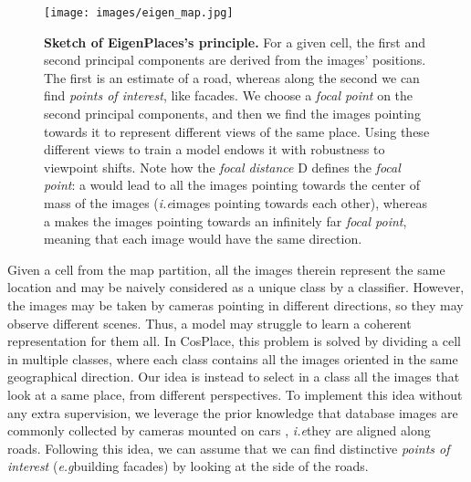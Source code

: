 \documentclass[10pt,twocolumn,letterpaper]{article}
\def\eg{\emph{e.g}\onedot}
\def\ie{\emph{i.e}\onedot}
\begin{document}
\begin{figure}
    \begin{center}
    \texttt{[image: images/eigen\_map.jpg]}
    \end{center}
    \caption{\textbf{Sketch of EigenPlaces's principle.}
    For a given cell, the first and second principal components are derived from the images' positions.
    The first is an estimate of a road, whereas along the second we can find \textit{points of interest}, like facades.
    We choose a \textit{focal point} on the second principal components, and then we find the images pointing towards it to represent different views of the same place. Using these different views to train a model endows it with robustness to viewpoint shifts.
    Note how the \textit{focal distance} D defines the \textit{focal point}: a  would lead to all the images pointing towards the center of mass of the images (\ie images pointing towards each other), whereas a  makes the images pointing towards an infinitely far \textit{focal point}, meaning that each image would have the same direction.
    }
    \label{fig:eigen_map}
\end{figure}
 Given a cell from the map partition, all the images therein represent the same location and may be naively considered as a unique class by a classifier. However, the images may be taken by cameras pointing in different directions, so they may observe different scenes.
Thus, a model may struggle to learn a coherent representation for them all.
In CosPlace, this problem is solved by dividing a cell in multiple classes, where each class contains all the images oriented in the same geographical direction. 
Our idea is instead to select in a class all the images that look at a same place, from different perspectives.
To implement this idea without any extra supervision, we leverage the prior knowledge that database images are commonly collected by cameras mounted on cars \cite{Torii_2015_pitts250k, Torii_2018_tokyo247, Maddern_2017_robotCar, Berton_2021_svox, Alibey_2022_gsvcities, Milford_2008_st_lucia, Chen_2011_san_francisco, Warburg_2020_msls}, \ie they are aligned along roads.
Following this idea, we can assume that we can find distinctive \textit{points of interest} (\eg building facades) by looking at the side of the roads. 
\end{document}
